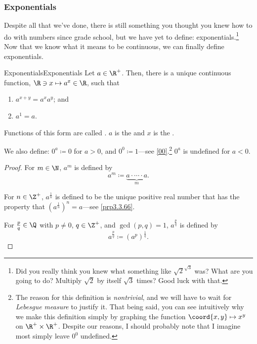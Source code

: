 \subsubsection{Exponentials}

Despite all that we've done, there is still something you thought you knew how to do with numbers since grade school, but we have yet to define:  exponentials.\footnote{Did you really think you knew what something like $\sqrt{2}^{\sqrt{3}}$ was?  What are you going to do?  Multiply $\sqrt{2}$ by itself $\sqrt{3}$ times?  Good luck with that.}  Now that we know what it means to be continuous, we can finally define exponentials.
\begin{thm}{Exponentials}{Exponentials}
Let $a\in \R ^+$.  Then, there is a unique continuous function, $\R \ni x\mapsto a^x\in \R$, such that
\begin{enumerate}
\item $a^{x+y}=a^xa^y$; and
\item $a^1=a$.
\end{enumerate}
Functions of this form are called .  $a$ is the  and $x$ is the .
\begin{rmk}
We also define:  $0^a\coloneqq 0$ for $a>0$, and $0^0\coloneqq 1$---see \cref{00}.\footnote{The reason for this definition is \emph{nontrivial}, and we will have to wait for \emph{Lebesgue measure} to justify it.  That being said, you can see intuitively why we make this definition simply by graphing the function $\coord{x,y}\mapsto x^y$ on $\R ^+\times \R ^+$.  Despite our reasons, I should probably note that I imagine most simply leave $0^0$ undefined.}  $0^a$ is undefined for $a<0$.
\end{rmk}
\begin{proof}
For $m\in \N$, $a^m$ is defined by
\begin{equation}
a^m\coloneqq \underbrace{a\cdot \cdots \cdot a}_m.
\end{equation}

For $n\in \Z ^+$, $a^{\frac{1}{n}}$ is defined to be the unique positive real number that has the property that $(a^{\frac{1}{n}})^n=a$---see \cref{prp3.3.66}.

For $\frac{p}{q}\in \Q$ with $p\neq 0$, $q\in \Z ^+$, and $\gcd (p,q)=1$, $a^{\frac{p}{q}}$ is defined by
\begin{equation}
a^{\frac{p}{q}}\coloneqq (a^p)^{\tfrac{1}{q}}.
\end{equation}


\end{proof}
\end{thm}
